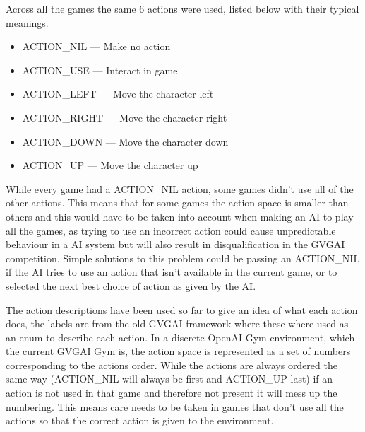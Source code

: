 \documentclass[a4paper]{article}
\begin{document}
\begin{description}
\setlength{\itemsep}{0pt}
\setlength{\parskip}{0pt}
\item [Total number of actions]
Across all the games the same 6 actions were used, listed below with their typical meanings.
\begin{multicols}{2}
    \begin{itemize}[noitemsep,nolistsep]
        \item ACTION\_NIL --- Make no action
        \item ACTION\_USE --- Interact in game
        \item ACTION\_LEFT --- Move the character left
        \item ACTION\_RIGHT --- Move the character right
        \item ACTION\_DOWN --- Move the character down
        \item ACTION\_UP --- Move the character up
    \end{itemize}
\end{multicols}
\item [Not all games used all actions]
While every game had a ACTION\_NIL action, some games didn't use all of the other actions.
This means that for some games the action space is smaller than others and this would have to be taken into account when making an AI to play all the games, as trying to use an incorrect action could cause unpredictable behaviour in a AI system but will also result in disqualification in the GVGAI competition.
Simple solutions to this problem could be passing an ACTION\_NIL if the AI tries to use an action that isn't available in the current game, or to selected the next best choice of action as given by the AI\@.
\item [The Actions weren't numbered the same]
The action descriptions have been used so far to give an idea of what each action does, the labels are from the old GVGAI framework where these where used as an enum to describe each action.
In a discrete OpenAI Gym environment, which the current GVGAI Gym is, the action space is represented as a set of numbers corresponding to the actions order.
While the actions are always ordered the same way (ACTION\_NIL will always be first and ACTION\_UP last) if an action is not used in that game and therefore not present it will mess up the numbering.
This means care needs to be taken in games that don't use all the actions so that the correct action is given to the environment.
\end{description}
\end{document}
